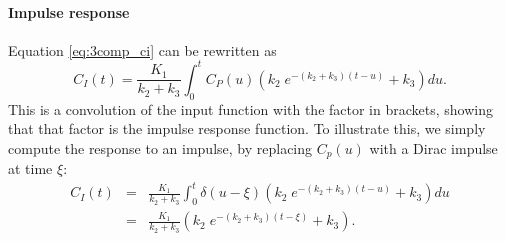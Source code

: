 \paragraph{Impulse response\\}
Equation \ref{eq:3comp_ci} can be rewritten as
\begin{equation}
  C_I(t) = \frac{K_1}{k_2 + k_3} \int_0^t C_P(u) \left(
       k_2 \; e^{-(k_2 + k_3)(t - u)} + k_3 \right) du.
\end{equation}
This is a convolution of the input function with the factor in
brackets, showing that that factor is the impulse response
function. To illustrate this, we simply compute the response to an
impulse, by replacing $C_p(u)$ with a Dirac impulse at time $\xi$:
\begin{align}
  C_I(t) &=& \frac{K_1}{k_2 + k_3} \int_0^t \delta(u-\xi) \left(
                k_2 \; e^{-(k_2 + k_3)(t - u)} + k_3 \right) du\\
   &=& \frac{K_1}{k_2 + k_3} \left( k_2 \; e^{-(k_2 + k_3)(t - \xi)} +
                k_3 \right).
\end{align}


